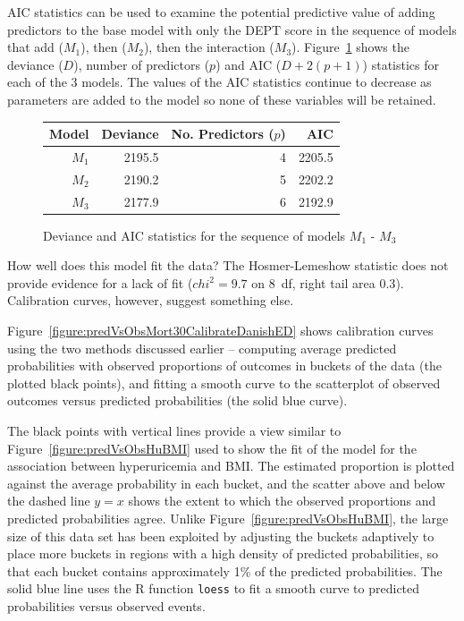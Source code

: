 AIC statistics can be used to examine the potential predictive value of adding predictors to the base model with only the DEPT score in the sequence of models that add   ($M_1$), then  ($M_2$), then the interaction  ($M_3$).  Figure~\ref{DevianceAICDeptAgeSexFullData} shows the deviance ($D$), number of predictors ($p$) and AIC ($D + 2(p+1)$) statistics for each of the 3 models.  The values of the AIC statistics continue to decrease as parameters are added to the model so none of these variables will be retained.  

\begin{figure}[ht]
  \centering
    \begin{tabular}{rrrr}
    \hline
      Model & Deviance & No. Predictors ($p$) & AIC \\
      \hline
      $M_1$ & 2195.5 &  4 & 2205.5 \\
      $M_2$ & 2190.2 &  5 & 2202.2 \\
      $M_3$ & 2177.9 &  6 & 2192.9 \\
      \hline
    \end{tabular}
  \caption{Deviance and AIC statistics for the sequence of models $M_1$ - $M_3$}
  \label{DevianceAICDeptAgeSexFullData}
\end{figure}

How well does this model fit the data?  The Hosmer-Lemeshow statistic does not provide evidence for a lack of fit ($chi^2 = 9.7$ on 8~df, right tail area $0.3$).   Calibration curves, however, suggest something else.

Figure~\ref{figure:predVsObsMort30CalibrateDanishED} shows calibration curves using the two methods discussed earlier -- computing average predicted probabilities with observed proportions of outcomes in buckets of the data (the plotted black points), and fitting a smooth curve to the scatterplot of observed outcomes versus predicted probabilities (the solid blue curve). 

The black points with vertical lines provide a view similar to Figure~\ref{figure:predVsObsHuBMI} used to show the fit of the model for the association between hyperuricemia and BMI\@. The estimated proportion is plotted against the average probability in each bucket, and the scatter above and below the dashed line $y = x$ shows the extent to which the observed proportions and predicted probabilities agree.   Unlike Figure~\ref{figure:predVsObsHuBMI},  the large size of this data set has been exploited by adjusting the buckets adaptively to place more buckets in regions with a high density of predicted probabilities, so that each bucket contains approximately 1\% of the predicted probabilities. The solid blue line uses the \textsf{R} function \texttt{loess} to fit a smooth curve to predicted probabilities versus observed events.


